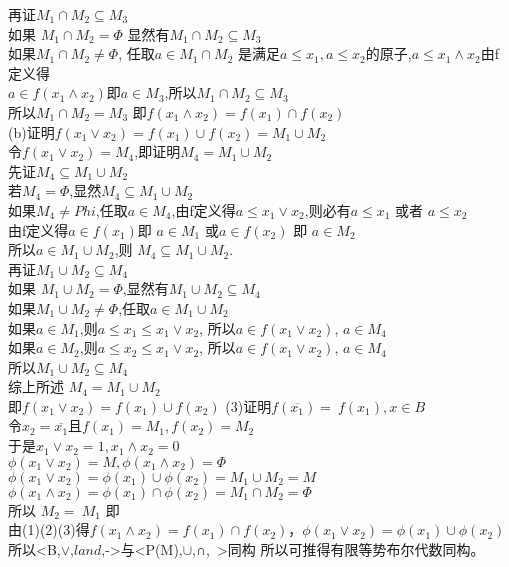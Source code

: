 \documentclass[a4paper, justified]{tufte-handout}
\begin{document}
\begin{solution}
  再证$M_1 \cap M_2 \subseteq M_3$\\
  如果 $M_1 \cap M_2 = \Phi$ 显然有$M_1 \cap M_2 \subseteq M_3$\\
  如果$M_1 \cap M_2 \neq \Phi$, 任取$a \in M_1 \cap M_2$ 是满足$a \leqslant x_1, a \leqslant x_2$的原子,$a \leqslant x_1 \land x_2$由f定义得\\
  $a\in f(x_1 \land x_2)$即$a\in M_3$,所以$M_1 \cap M_2 \subseteq M_3$\\
  所以$M_1 \cap M_2 = M_3$ 即$f(x_1 \land x_2) = f(x_1) \cap f(x_2)$\\
  (b)证明$f(x_1 \lor x_2) = f(x_1) \cup f(x_2) = M_1 \cup M_2$\\
  令$f(x_1 \lor x_2) = M_4$,即证明$M_4 = M_1 \cup M_2$\\
  先证$M_4 \subseteq M_1 \cup M_2$\\
  若$M_4 = \Phi$,显然$M_4 \subseteq M_1 \cup M_2$\\
  如果$M_4 \neq Phi$,任取$a \in M_4$,由f定义得$a \leqslant x_1 \lor x_2$,则必有$a \leqslant x_1$ 或者 $a \leqslant x_2$\\
  由f定义得$a\in f(x_1)$即 $a \in M_1$ 或$a \in f(x_2)$ 即 $a \in M_2$\\
  所以$a \in M_1 \cup M_2$,则 $M_4 \subseteq M_1 \cup M_2$.\\
  再证$M_1 \cup M_2 \subseteq M_4$\\
  如果 $M_1 \cup M_2 = \Phi$,显然有$M_1 \cup M_2 \subseteq M_4$\\
  如果$M_1 \cup M_2 \neq \Phi$,任取$a \in M_1 \cup M_2$\\
  如果$a \in M_1$,则$a \leqslant x_1 \leqslant x_1 \lor x_2$, 所以$a \in f(x_1 \lor x_2)$, $a \in M_4$\\
  如果$a \in M_2$,则$a \leqslant x_2 \leqslant x_1 \lor x_2$, 所以$a \in f(x_1 \lor x_2)$, $a \in M_4$\\
  所以$M_1 \cup M_2 \subseteq M_4$\\
  综上所述 $M_4 = M_1 \cup M_2$\\
  即$f(x_1 \lor x_2) = f(x_1) \cup f(x_2)$
  (3)证明$f(\overline{x_1}) = ~f(x_1), x \in B$\\
  令$x_2 = \overline{x_1}$且$f(x_1) = M_1,f(x_2) = M_2$\\
  于是$x_1 \lor x_2 = 1, x_1 \land x_2 = 0$\\
  $\phi(x_1 \lor x_2) = M, \phi(x_1 \land x_2) = \Phi$\\
  $\phi(x_1 \lor x_2) =\phi(x_1) \cup \phi(x_2) = M_1 \cup M_2 = M$\\
  $\phi(x_1 \land x_2) =\phi(x_1) \cap \phi(x_2) = M_1 \cap M_2 = \Phi$\\
  所以 $M_2 = ~M_1$ 即\\
  由(1)(2)(3)得$f(x_1 \land x_2) = f(x_1) \cap f(x_2)，\phi(x_1 \lor x_2) =\phi(x_1) \cup \phi(x_2)$
  所以<B,$\lor$,$land$,->与<P(M),$\cup$,∩,~>同构
  所以可推得有限等势布尔代数同构。
\end{solution}
\end{document}
